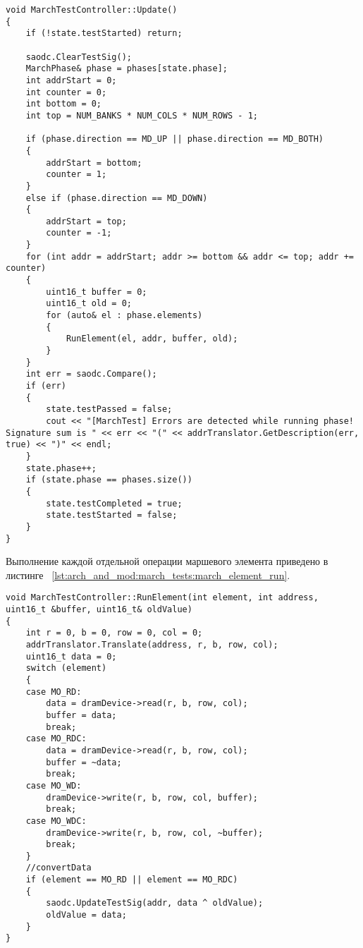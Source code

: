 \begin{lstlisting}[style=cplusplusstyle, caption={Функция выполнения маршевого теста}, label=lst:arch_and_mod:march_tests:march_run]
void MarchTestController::Update()
{
    if (!state.testStarted) return;

    saodc.ClearTestSig();
    MarchPhase& phase = phases[state.phase];
    int addrStart = 0;
    int counter = 0;
    int bottom = 0;
    int top = NUM_BANKS * NUM_COLS * NUM_ROWS - 1;

    if (phase.direction == MD_UP || phase.direction == MD_BOTH)
    {
        addrStart = bottom;
        counter = 1;
    }
    else if (phase.direction == MD_DOWN)
    {
        addrStart = top;
        counter = -1;
    }
    for (int addr = addrStart; addr >= bottom && addr <= top; addr += counter)
    {
        uint16_t buffer = 0;
        uint16_t old = 0;
        for (auto& el : phase.elements)
        {
            RunElement(el, addr, buffer, old);
        }
    }
    int err = saodc.Compare();
    if (err)
    {
        state.testPassed = false;
        cout << "[MarchTest] Errors are detected while running phase! Signature sum is " << err << "(" << addrTranslator.GetDescription(err, true) << ")" << endl;
    }
    state.phase++;
    if (state.phase == phases.size())
    {
        state.testCompleted = true;
        state.testStarted = false;
    }
}
\end{lstlisting} 

Выполнение каждой отдельной операции маршевого элемента приведено в листинге ~\ref{lst:arch_and_mod:march_tests:march_element_run}.

\begin{lstlisting}[style=cplusplusstyle, caption={Выполнение элемента маршевого теста}, label=lst:arch_and_mod:march_tests:march_element_run]
void MarchTestController::RunElement(int element, int address, uint16_t &buffer, uint16_t& oldValue)
{
    int r = 0, b = 0, row = 0, col = 0;
    addrTranslator.Translate(address, r, b, row, col);
    uint16_t data = 0;
    switch (element)
    {
    case MO_RD:
        data = dramDevice->read(r, b, row, col);
        buffer = data;
        break;
    case MO_RDC:
        data = dramDevice->read(r, b, row, col);
        buffer = ~data;
        break;
    case MO_WD:
        dramDevice->write(r, b, row, col, buffer);
        break;
    case MO_WDC:
        dramDevice->write(r, b, row, col, ~buffer);
        break;
    }
    //convertData
    if (element == MO_RD || element == MO_RDC)
    {
        saodc.UpdateTestSig(addr, data ^ oldValue);
        oldValue = data;
    }
}
\end{lstlisting} 

